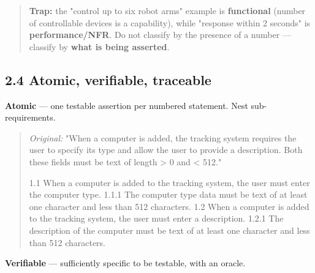 \begin{studycolumns}
\vspace{0pt}


\begin{quote}\small\color{navy}
\textbf{Trap:} the "control up to six robot arms" example is \textbf{functional} (number of controllable devices is a capability), while "response within 2 seconds" is \textbf{performance/\allowbreak{}NFR}. Do not classify by the presence of a number --- classify by \textbf{what is being asserted}.

\end{quote}
\subsection*{2.4 Atomic, verifiable, traceable}
\textbf{Atomic} --- one testable assertion per numbered statement. Nest sub-requirements.


\begin{quote}\small\color{navy}
\emph{Original:} "When a computer is added, the tracking system requires the user to specify its type and allow the user to provide a description. Both these fields must be text of length > 0 and < 512."


\begin{ReferenceCode}
1.1   When a computer is added to the tracking system, the user must enter the computer type.
1.1.1 The computer type data must be text of at least one character and less than 512 characters.
1.2   When a computer is added to the tracking system, the user must enter a description.
1.2.1 The description of the computer must be text of at least one character and less than 512 characters.
\end{ReferenceCode}
\end{quote}
\textbf{Verifiable} --- sufficiently specific to be testable, with an oracle.



\end{studycolumns}
